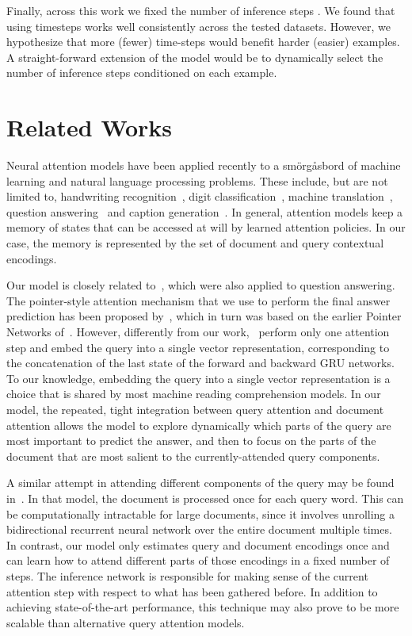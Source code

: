 \documentclass[11pt]{article}
\begin{document}
Finally, across this work we fixed the number of inference steps . We found that using  timesteps works well consistently across the tested datasets. However, we hypothesize that more (fewer) time-steps would benefit harder (easier) examples. A straight-forward extension of the model would be to dynamically select the number of inference steps conditioned on each example.
 
\section{Related Works}


Neural attention models have been applied recently to a sm\"org\aa sbord of machine learning and natural language processing problems. These include, but are not limited to, handwriting recognition~\cite{Graves13}, digit classification~\cite{mnih2014recurrent}, machine translation~\cite{bahdanau2014neural}, question answering~\cite{sukhbaatar2015end,hermann2015teaching} and caption generation~\cite{xu2015show}.
In general, attention models keep a memory of states that can be accessed at will by learned attention policies.
In our case, the memory is represented by the set of document and query contextual encodings.


Our model is closely related to~\cite{sukhbaatar2015end,kumar2015ask,hermann2015teaching,watson,hill2015goldilocks}, which were also applied to question answering.
The pointer-style attention mechanism that we use to perform the final answer prediction has been proposed by~\cite{watson}, which in turn was based on the earlier Pointer Networks of~\cite{vinyals2015pointer}.  However, differently from our work,~\cite{watson} perform only one attention step and embed the query into a single vector representation, corresponding to the concatenation of the last state of the forward and backward GRU networks. To our knowledge, embedding the query into a single vector representation is a choice that is shared by most machine reading comprehension models. In our model, the repeated, tight integration between query attention and document attention allows the model to explore dynamically which parts of the query are most important to predict the answer, and then to focus on the parts of the document that are most salient to the currently-attended query components.

A similar attempt in attending different components of the query may be found in~\cite{hermann2015teaching}. In that model, the document is processed once for each query word. This can be computationally intractable for large documents, since it involves unrolling a bidirectional recurrent neural network over the entire document multiple times. In contrast, our model only estimates query and document encodings once and can learn how to attend different parts of those encodings in a fixed number of steps. The inference network is responsible for making sense of the current attention step with respect to what has been gathered before. In addition to achieving state-of-the-art performance, this technique may also prove to be more scalable than alternative query attention models.
\end{document}
